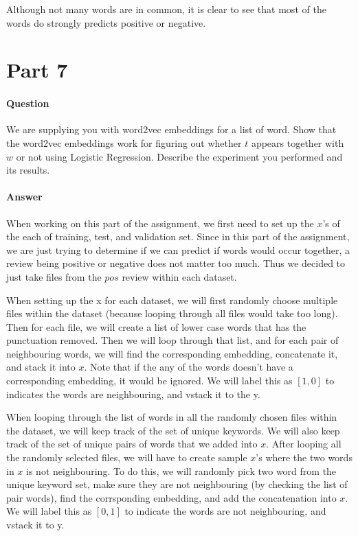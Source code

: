 \documentclass[11pt,twoside]{article}
\begin{document}
Although not many words are in common, it is clear to see that most of the words do strongly predicts positive or negative.
\clearpage

\section*{Part 7}
\paragraph{Question}
We are supplying you with word2vec embeddings for a list of word. Show that the word2vec embeddings work for figuring out whether $t$ appears together with $w$ or not using Logistic Regression. Describe the experiment you performed and its results.

\paragraph{Answer}
When working on this part of the assignment, we first need to set up the $x$'s of the each of training, test, and validation set. Since in this part of the assignment, we are just trying to determine if we can predict if words would occur together, a review being positive or negative does not matter too much. Thus we decided to just take files from the $pos$ review within each dataset.

When setting up the x for each dataset, we will first randomly choose multiple files within the dataset (because looping through all files would take too long). Then for each file, we will create a list of lower case words that has the punctuation removed. Then we will loop through that list, and for each pair of neighbouring words, we will find the corresponding embedding, concatenate it, and stack it into $x$. Note that if the any of the words doesn't have a corresponding embedding, it would be ignored. We will label this as $[1, 0]$ to indicates the words are neighbouring, and vstack it to the y.

When looping through the list of words in all the randomly chosen files within the dataset, we will keep track of the set of unique keywords. We will also keep track of the set of unique pairs of words that we added into $x$. After looping all the randomly selected files, we will have to create sample $x$'s where the two words in $x$ is not neighbouring. To do this, we will randomly pick two word from the unique keyword set, make sure they are not neighbouring (by checking the list of pair words), find the corrsponding embedding, and add the concatenation into $x$. We will label this as $[0, 1]$ to indicate the words are not neighbouring, and vstack it to y.
\end{document}
